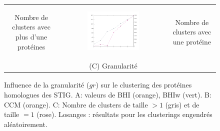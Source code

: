 \begin{figure}[H]
\begin{center}
\begin{tabular}{ccc}
	\begin{turn}{90}\scriptsize\color{blue}Nombre de clusters avec plus d'une protéines \end{turn}&\includegraphics[width=0.50\textwidth, trim=15mm 10mm 9mm 0mm ,clip]{./img/clusteval3.png}&\begin{turn}{90}\scriptsize \color{magenta}\hspace{0.3cm}Nombre de clusters avec une protéine \end{turn}\\
	&\scriptsize (C) Granularité\\
	\end{tabular}
	\end{center}
	\caption[Influence de la granularité sur le clustering]{Influence de la granularité ($gr$) sur le clustering des protéines homologues des STIG. A: valeurs de BHI (orange), BHIw (vert). B: CCM (orange). C: Nombre de clusters de taille $>1$ (gris) et de taille $=1$ (rose). Losanges : résultats pour les clusterings engendrés aléatoirement.}\label{figclusteval}
	\end{figure}
    
